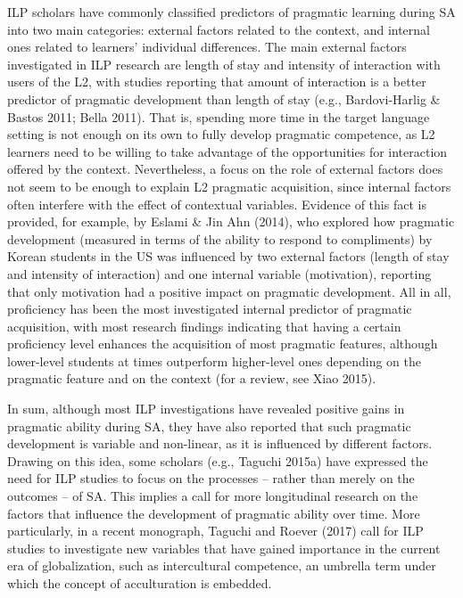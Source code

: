 \documentclass[12pt]{article}
\newenvironment{styleStandard}{\setlength\leftskip{0cm}\setlength\rightskip{0cm plus 1fil}\setlength\parindent{0cm}\setlength\parfillskip{0pt plus 1fil}\setlength\parskip{0in plus 1pt}\writerlistparindent\writerlistleftskip\leavevmode\normalfont\normalsize\writerlistlabel\ignorespaces}{\unskip\vspace{0.111in plus 0.0111in}\par}
\newcommand\writerlistleftskip{}
\newcommand\writerlistparindent{}
\newcommand\writerlistlabel{}
\begin{document}
\begin{styleStandard}
ILP scholars have commonly classified predictors of pragmatic learning during SA into two main categories: external factors related to the context, and internal ones related to learners’ individual differences. The main external factors investigated in ILP research are length of stay and intensity of interaction with users of the L2, with studies reporting that amount of interaction is a better predictor of pragmatic development than length of stay (e.g., Bardovi-Harlig \& Bastos 2011; Bella 2011). That is, spending more time in the target language setting is not enough on its own to fully develop pragmatic competence, as L2 learners need to be willing to take advantage of the opportunities for interaction offered by the context. Nevertheless, a focus on the role of external factors does not seem to be enough to explain L2 pragmatic acquisition, since internal factors often interfere with the effect of contextual variables. Evidence of this fact is provided, for example, by Eslami \& Jin Ahn (2014), who explored how pragmatic development (measured in terms of the ability to respond to compliments) by Korean students in the US was influenced by two external factors (length of stay and intensity of interaction) and one internal variable (motivation), reporting that only motivation had a positive impact on pragmatic development. All in all, proficiency has been the most investigated internal predictor of pragmatic acquisition, with most research findings indicating that having a certain proficiency level enhances the acquisition of most pragmatic features, although lower-level students at times outperform higher-level ones depending on the pragmatic feature and on the context (for a review, see Xiao 2015).
\end{styleStandard}

\begin{styleStandard}
In sum, although most ILP investigations have revealed positive gains in pragmatic ability during SA, they have also reported that such pragmatic development is variable and non-linear, as it is influenced by different factors. Drawing on this idea, some scholars (e.g., Taguchi 2015a) have expressed the need for ILP studies to focus on the processes – rather than merely on the outcomes – of SA. This implies a call for more longitudinal research on the factors that influence the development of pragmatic ability over time. More particularly, in a recent monograph, Taguchi and Roever (2017) call for ILP studies to investigate new variables that have gained importance in the current era of globalization, such as intercultural competence, an umbrella term under which the concept of acculturation is embedded.
\end{styleStandard}
\end{document}
